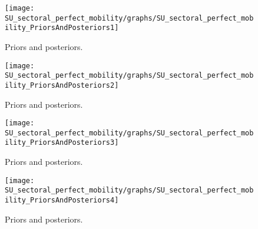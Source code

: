  
\begin{figure}[H]
\centering
\texttt{[image: SU\_sectoral\_perfect\_mobility/graphs/SU\_sectoral\_perfect\_mobility\_PriorsAndPosteriors1]}
\caption{Priors and posteriors.}\label{Fig:PriorsAndPosteriors:1}
\end{figure}
 
\begin{figure}[H]
\centering
\texttt{[image: SU\_sectoral\_perfect\_mobility/graphs/SU\_sectoral\_perfect\_mobility\_PriorsAndPosteriors2]}
\caption{Priors and posteriors.}\label{Fig:PriorsAndPosteriors:2}
\end{figure}
 
\begin{figure}[H]
\centering
\texttt{[image: SU\_sectoral\_perfect\_mobility/graphs/SU\_sectoral\_perfect\_mobility\_PriorsAndPosteriors3]}
\caption{Priors and posteriors.}\label{Fig:PriorsAndPosteriors:3}
\end{figure}
 
\begin{figure}[H]
\centering
\texttt{[image: SU\_sectoral\_perfect\_mobility/graphs/SU\_sectoral\_perfect\_mobility\_PriorsAndPosteriors4]}
\caption{Priors and posteriors.}\label{Fig:PriorsAndPosteriors:4}
\end{figure}
 
